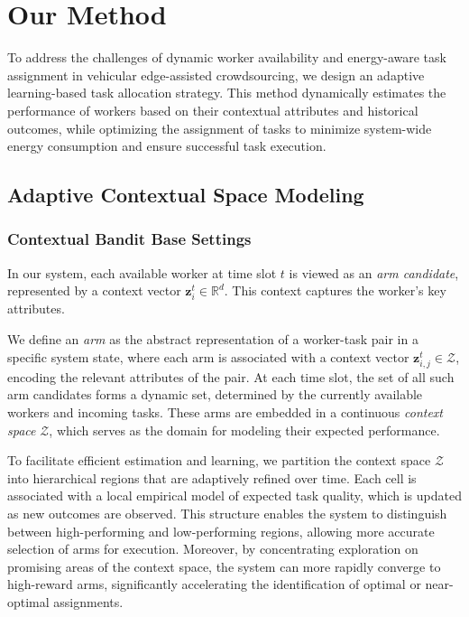 

\section{Our Method}

To address the challenges of dynamic worker availability and energy-aware task assignment in vehicular edge-assisted crowdsourcing, we design an adaptive learning-based task allocation strategy. This method dynamically estimates the performance of workers based on their contextual attributes and historical outcomes, while optimizing the assignment of tasks to minimize system-wide energy consumption and ensure successful task execution.

\subsection{Adaptive Contextual Space Modeling}

\subsubsection{Contextual Bandit Base Settings}
In our system, each available worker at time slot $t$ is viewed as an \textit{arm candidate}, represented by a context vector $\mathbf{z}_i^t \in \mathbb{R}^d$. This context captures the worker’s key attributes.

We define an \textit{arm} as the abstract representation of a worker-task pair in a specific system state, where each arm is associated with a context vector \( \mathbf{z}_{i,j}^t \in \mathcal{Z} \), encoding the relevant attributes of the pair. At each time slot, the set of all such arm candidates forms a dynamic set, determined by the currently available workers and incoming tasks. These arms are embedded in a continuous \textit{context space} \( \mathcal{Z} \), which serves as the domain for modeling their expected performance.

To facilitate efficient estimation and learning, we partition the context space \(\mathcal{Z}\) into hierarchical regions that are adaptively refined over time. Each cell is associated with a local empirical model of expected task quality, which is updated as new outcomes are observed. This structure enables the system to distinguish between high-performing and low-performing regions, allowing more accurate selection of arms for execution. Moreover, by concentrating exploration on promising areas of the context space, the system can more rapidly converge to high-reward arms, significantly accelerating the identification of optimal or near-optimal assignments.

